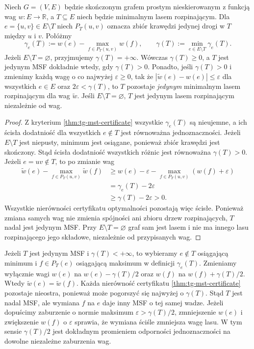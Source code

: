 \begin{wniosek}
\label{cor:tg-mst-stability-gap}
Niech $G=(V,E)$ będzie skończonym
grafem prostym nieskierowanym z funkcją wag
$w:E\to\mathbb R$, a $T\subseteq E$
niech będzie minimalnym lasem rozpinającym.
Dla $e=\{u,v\}\in E\setminus T$ niech $P_T(u,v)$
oznacza zbiór krawędzi jedynej drogi w $T$ między
$u$ i $v$. Połóżmy
\[
\gamma_e(T):=
w(e)-\max_{f\in P_T(u,v)}w(f),
\qquad
\gamma(T):=
\min_{e\in E\setminus T}\gamma_e(T).
\]
Jeżeli $E\setminus T=\varnothing$,
przyjmujemy $\gamma(T)=+\infty$.
Wówczas $\gamma(T)\ge0$, a
$T$ jest jedynym MSF
dokładnie wtedy, gdy
$\gamma(T)>0$.
Ponadto, jeśli $\gamma(T)>0$
i zmienimy każdą wagę o
co najwyżej $\varepsilon\ge0$,
tak że
$|\widetilde w(e)-w(e)|\le\varepsilon$
dla wszystkich $e\in E$
oraz $2\varepsilon<\gamma(T)$,
to $T$ pozostaje
\emph{jedynym} minimalnym
lasem rozpinającym
dla wag $\widetilde w$.
Jeśli $E\setminus T=\varnothing$,
$T$ jest jedynym lasem
rozpinającym niezależnie
od wag.
\end{wniosek}

\begin{proof}
Z kryterium
\ref{thm:tg-mst-certificate}
wszystkie $\gamma_e(T)$
są nieujemne, a ich
ścisła dodatniość
dla wszystkich $e\notin T$
jest równoważna
jednoznaczności. Jeżeli $E\setminus T$ jest
niepusty, minimum jest osiągane, ponieważ zbiór
krawędzi jest skończony. Stąd ścisła dodatniość
wszystkich różnic jest równoważna $\gamma(T)>0$.
Jeżeli $e=uv\notin T$,
to po zmianie wag
\[
\begin{aligned}
\widetilde w(e)-
\max_{f\in P_T(u,v)}\widetilde w(f)
&\ge w(e)-\varepsilon
-\max_{f\in P_T(u,v)}(w(f)+\varepsilon)\\
&=\gamma_e(T)-2\varepsilon\\
&\ge\gamma(T)-2\varepsilon>0.
\end{aligned}
\]
Wszystkie nierówności
certyfikatu optymalności
pozostają więc ścisłe.
Ponieważ zmiana samych wag
nie zmienia spójności
ani zbioru drzew rozpinających,
$T$ nadal jest jedynym MSF.
Przy $E\setminus T=\varnothing$
graf sam jest lasem i
nie ma innego lasu rozpinającego
jego składowe, niezależnie
od przypisanych wag.
\end{proof}

\begin{uwaga}
Jeżeli $T$ jest jedynym MSF i $\gamma(T)<+\infty$,
to wybieramy $e\notin T$ osiągającą minimum
i $f\in P_T(e)$ osiągającą maksimum w definicji
$\gamma_e(T)$. Zmieniamy wyłącznie wagi
$w(e)$ na $w(e)-\gamma(T)/2$ oraz $w(f)$
na $w(f)+\gamma(T)/2$.
Wtedy $\widetilde w(e)=\widetilde w(f)$.
Każda nierówność certyfikatu
\ref{thm:tg-mst-certificate} pozostaje nieostra,
ponieważ może pogorszyć się najwyżej o $\gamma(T)$.
Stąd $T$ jest nadal MSF, ale wymiana $f$ na $e$
daje inny MSF o tej samej wadze.
Jeżeli dopuścimy zaburzenie o normie maksimum
$\varepsilon>\gamma(T)/2$, zmniejszenie $w(e)$
i zwiększenie $w(f)$ o $\varepsilon$ sprawia,
że wymiana ściśle zmniejsza wagę lasu.
W tym sensie $\gamma(T)/2$ jest dokładnym
promieniem odporności jednoznaczności na
dowolne niezależne zaburzenia wag.
\end{uwaga}

